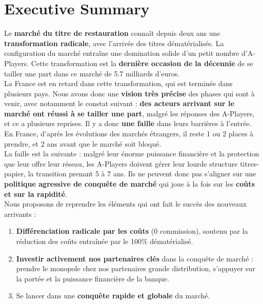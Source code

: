 




\section{Executive Summary}
Le \textbf{marché du titre de restauration} connaît depuis deux ans une
\textbf{transformation radicale}, avec l’arrivée des titres dématérialisés. La
configuration du marché entraîne une domination solide d’un petit nombre
d’A-Players. Cette transformation est la \textbf{dernière occasion de la
décennie} de se tailler une part dans ce marché de 5.7 milliards d’euros. \\

La France est en retard dans cette transformation, qui est terminée dans
plusieurs pays. Nous avons donc une \textbf{vision très précise} des phases qui
sont à venir, avec notamment le constat suivant : \textbf{des acteurs arrivant
sur le marché ont réussi à se tailler une part}, malgré les réponses des
A-Players, et ce a plusieurs reprises. Il y a donc \textbf{une faille} dans
leurs barrières à l’entrée. En France, d’après les évolutions des marchés
étrangers, il reste 1 ou 2 places à prendre, et 2 ans avant que le marché soit
bloqué. \\

La faille est la suivante : malgré leur énorme puissance financière et la
protection que leur offre leur réseau, les A-Players doivent gérer leur lourde
structure titres-papier, la transition prenant 5 à 7 ans. Ils ne peuvent donc
pas s’aligner sur une \textbf{politique agressive de conquête de marché} qui
joue à la fois sur les \textbf{coûts et sur la rapidité}. \\

Nous proposons de reprendre les éléments qui ont fait le succès des nouveaux
arrivants : \\
\begin{enumerate}
  \item \textbf{Différenciation radicale par les coûts} (0 commission), soutenu par la
    réduction des coûts entraînée par le 100\% dématérialisé.
  \item \textbf{Investir activement nos partenaires clés} dans la conquête de marché :
    prendre le monopole chez nos partenaires grande distribution, s’appuyer sur
    la portée et la puissance financière de la banque.
  \item Se lancer dans une \textbf{conquête rapide et globale} du marché. 
\end{enumerate}
~\\

